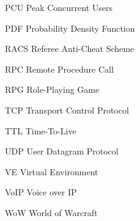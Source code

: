 \begin{Nomencl}[\gnat]
        \item[PCU]      Peak Concurrent Users
        \item[PDF]      Probability Density Function
        \item[RACS]     Referee Anti-Cheat Scheme
        \item[RPC]      Remote Procedure Call
        \item[RPG]      Role-Playing Game
        \item[TCP]      Transport Control Protocol
        \item[TTL]      Time-To-Live
        \item[UDP]      User Datagram Protocol
        \item[VE]       Virtual Environment
        \item[VoIP]     Voice over IP
        \item[WoW]      World of Warcraft
\end{Nomencl}
\endinput
